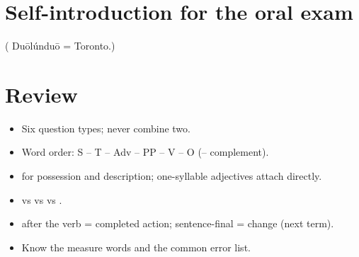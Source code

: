 \section{Self-introduction for the oral exam}

\begin{example}

( Duōlúnduō = Toronto.)
\end{example}

\section*{Review}
\begin{itemize}
  \item Six question types; never combine two.
  \item Word order: S -- T -- Adv -- PP -- V -- O (--  complement).
  \item {} for possession and description; one-syllable adjectives attach directly.
  \item {} vs  vs  vs .
  \item {} after the verb = completed action; sentence-final  = change (next
        term).
  \item Know the measure words and the common error list.
\end{itemize}

